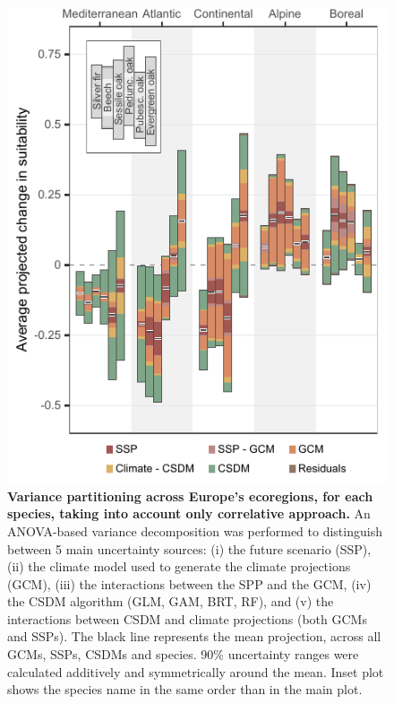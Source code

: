 \begin{figure}[htpb]
\centering
\vspace*{-0.3cm}
\includegraphics{chapter4/figs/anova_within_species_byecoregion_ONLYCSDM-1.pdf}
\caption{\textbf{Variance partitioning across Europe's ecoregions, for each species, taking into account only correlative approach.} An ANOVA-based variance decomposition was performed to distinguish between 5 main uncertainty sources: (i) the future scenario (SSP), (ii) the climate model used to generate the climate projections (GCM), (iii) the interactions between the SPP and the GCM, (iv) the CSDM algorithm (GLM, GAM, BRT, RF), and (v) the interactions between CSDM and climate projections (both GCMs and SSPs). The black line represents the mean projection, across all GCMs, SSPs, CSDMs and species. 90\% uncertainty ranges were calculated additively and symmetrically around the mean. Inset plot shows the species name in the same order than in the main plot.}
\label{app:anovawithinspeciesCSDM}
\vspace*{-5.2cm}
\end{figure}

\clearpage


